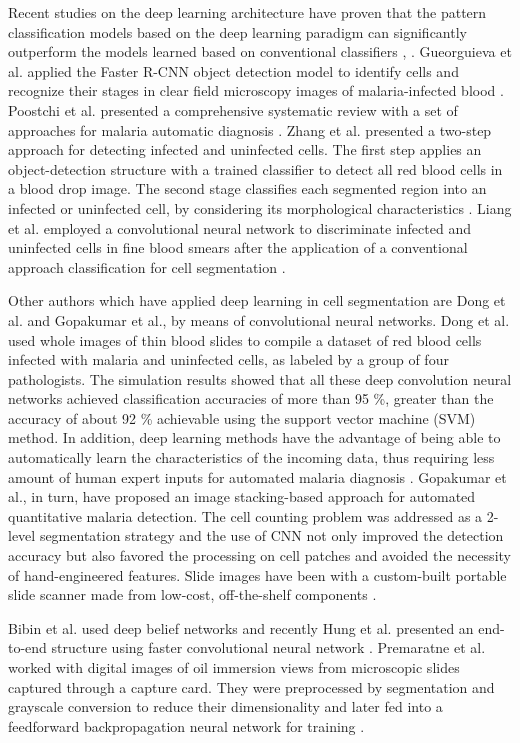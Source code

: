 Recent studies on the deep learning architecture have proven that the pattern classification models based on the deep learning paradigm can significantly outperform the models learned based on conventional classifiers \cite{hinton2002training}, \cite{nair20093d}. Gueorguieva et al. applied the Faster R-CNN object detection model to identify cells and recognize their stages in clear field microscopy images of malaria-infected blood \cite{hung2017applying}. Poostchi et al. presented a comprehensive systematic review with a set of approaches for malaria automatic diagnosis \cite{Poostchi2018}. Zhang et al. presented a two-step approach for detecting infected and uninfected cells. The first step applies an object-detection structure with a trained classifier to detect all red blood cells in a blood drop image. The second stage classifies each segmented region into an infected or uninfected cell, by considering its morphological characteristics \cite{Zhang2016}. Liang et al. employed a convolutional neural network to discriminate infected and uninfected cells in fine blood smears after the application of a conventional approach classification for cell segmentation \cite{Liang2017}.

Other authors which have applied deep learning in cell segmentation are Dong et al. and Gopakumar et al., by means of convolutional neural networks. Dong et al. used whole images of thin blood slides to compile a dataset of red blood cells infected with malaria and uninfected cells, as labeled by a group of four pathologists. The simulation results showed that all these deep convolution neural networks achieved classification accuracies of more than 95 \%, greater than the accuracy of about 92 \% achievable using the support vector machine (SVM) method. In addition, deep learning methods have the advantage of being able to automatically learn the characteristics of the incoming data, thus requiring less amount of human expert inputs for automated malaria diagnosis \cite {Dong2017} \cite{Dong2017a}. Gopakumar et al., in turn, have proposed an image stacking-based approach for automated quantitative malaria detection. The cell counting problem was addressed as a 2-level segmentation strategy and the use of CNN not only improved the detection accuracy but also favored the processing on cell patches and avoided the necessity of hand-engineered features. Slide images have been with a custom-built portable slide scanner made from low-cost, off-the-shelf components \cite{Gopakumar2018ConvolutionalScanner}.

Bibin et al. used deep belief networks and recently Hung et al. presented an end-to-end structure using faster convolutional neural network \cite{Bibin2017} \cite{hung2017applying}. Premaratne et al. worked with digital images of oil immersion views from microscopic slides captured through a capture card. They were preprocessed by segmentation and grayscale conversion to reduce their dimensionality and later fed into a feedforward backpropagation neural network for training \cite{Premaratne2006AFilms}.

